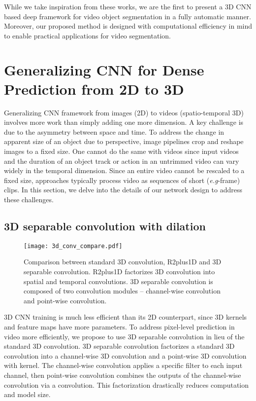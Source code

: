 \documentclass{bmvc2k}
\def\eg{\emph{e.g}\bmvaOneDot}
\begin{document}
While we take inspiration from these works, we are the first to present a 3D CNN based deep framework for video object segmentation in a fully automatic manner. Moreover, our proposed method is designed with computational efficiency in mind to enable practical applications for video segmentation.




\section{Generalizing CNN for Dense Prediction from 2D to 3D}
\label{sec:method}
Generalizing CNN framework from  images (2D) to videos (spatio-temporal 3D) involves more work than simply adding one more dimension. A key challenge is due to the asymmetry between space and time. To address the change in apparent size of an object due to perspective, image pipelines crop and reshape images to a fixed size. One cannot do the same with videos since  input videos and the duration of an object track or action in an untrimmed video can vary widely in the temporal dimension. Since an entire video cannot be rescaled to  a fixed size, approaches typically process video as sequences of short (\eg 8-frame) clips.
In this section, we delve into the details of our network design to address these challenges.




\subsection{3D separable convolution with dilation}
\label{sec:3d_separable_conv}
\begin{figure}
\centering
\texttt{[image: 3d\_conv\_compare.pdf]}
\caption{Comparison between standard 3D convolution, R2plus1D and 3D separable convolution. R2plus1D factorizes 3D convolution into spatial and temporal convolutions. 3D separable convolution is composed of two convolution modules -- channel-wise convolution and point-wise convolution. 
}
\label{fig:3d_conv_compare}
\end{figure}
3D CNN training is much less efficient than its 2D counterpart, since 3D kernels and feature maps have more parameters. To address pixel-level prediction in video more efficiently, we propose to use 3D separable convolution in lieu of the standard 3D convolution.
3D separable convolution factorizes a standard 3D convolution into a channel-wise 3D convolution and a point-wise 3D convolution with  kernel. The channel-wise convolution applies a specific filter to each input channel, then point-wise convolution combines the outputs of the channel-wise convolution via a  convolution. This factorization drastically reduces computation and model size.
\end{document}
